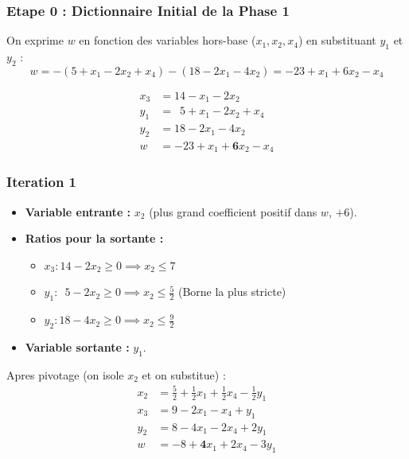 \documentclass[12pt,a4paper]{article}
\begin{document}
\subsubsection*{Etape 0 : Dictionnaire Initial de la Phase 1}
On exprime $w$ en fonction des variables hors-base ($x_1, x_2, x_4$) en substituant $y_1$ et $y_2$ :
$$w = -(5 + x_1 - 2x_2 + x_4) - (18 - 2x_1 - 4x_2) = -23 + x_1 + 6x_2 - x_4$$

\begin{align*}
x_3 &= 14 - x_1 - 2x_2 \\
y_1 &= \phantom{0}5 + x_1 - 2x_2 + x_4 \\
y_2 &= 18 - 2x_1 - 4x_2 \\
w &= -23 + x_1 + \mathbf{6}x_2 - x_4
\end{align*}

\hrulefill

\subsubsection*{Iteration 1}
\begin{itemize}
    \item \textbf{Variable entrante :} $x_2$ (plus grand coefficient positif dans $w$, $+6$).
    \item \textbf{Ratios pour la sortante :} 
    \begin{itemize}
        \item $x_3 : 14 - 2x_2 \geq 0 \implies x_2 \leq 7$
        \item $y_1 : \phantom{0}5 - 2x_2 \geq 0 \implies x_2 \leq \frac{5}{2}$ \quad \textcolor{importantrouge}{(Borne la plus stricte)}
        \item $y_2 : 18 - 4x_2 \geq 0 \implies x_2 \leq \frac{9}{2}$
    \end{itemize}
    \item \textbf{Variable sortante :} $y_1$.
\end{itemize}

Apres pivotage (on isole $x_2$ et on substitue) :
\begin{align*}
x_2 &= \frac{5}{2} + \frac{1}{2}x_1 + \frac{1}{2}x_4 - \frac{1}{2}y_1 \\
x_3 &= 9 - 2x_1 - x_4 + y_1 \\
y_2 &= 8 - 4x_1 - 2x_4 + 2y_1 \\
w &= -8 + \mathbf{4}x_1 + 2x_4 - 3y_1
\end{align*}

\hrulefill
\end{document}
